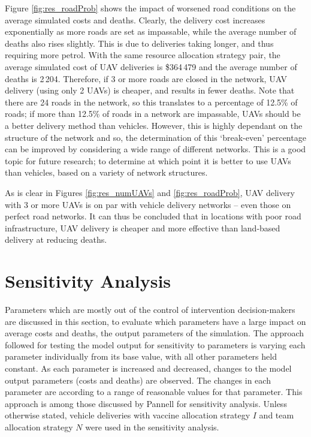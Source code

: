 Figure \ref{fig:res_roadProb} shows the impact of worsened road conditions on the average simulated costs and deaths. Clearly, the delivery cost increases exponentially as more roads are set as impassable, while the average number of deaths also rises slightly. This is due to deliveries taking longer, and thus requiring more petrol. With the same resource allocation strategy pair, the average simulated cost of UAV deliveries is \$364\,479 and the average number of deaths is 2\,204. Therefore, if 3 or more roads are closed in the network, UAV delivery (using only 2 UAVs) is cheaper, and results in fewer deaths. Note that there are 24 roads in the network, so this translates to a percentage of 12.5\% of roads; if more than 12.5\% of roads in a network are impassable, UAVs should be a better delivery method than vehicles. However, this is highly dependant on the structure of the network and so, the determination of this `break-even' percentage can be improved by considering a wide range of different networks. This is a good topic for future research; to determine at which point it is better to use UAVs than vehicles, based on a variety of network structures.

As is clear in Figures \ref{fig:res_numUAVs} and \ref{fig:res_roadProb}, UAV delivery with 3 or more UAVs is on par with vehicle delivery networks -- even those on perfect road networks. It can thus be concluded that in locations with poor road infrastructure, UAV delivery is cheaper and more effective than land-based delivery at reducing deaths.

\section{Sensitivity Analysis}
\label{sec:res_sensAn}
Parameters which are mostly out of the control of intervention decision-makers are discussed in this section, to evaluate which parameters have a large impact on average costs and deaths, the output parameters of the simulation.
The approach followed for testing the model output for sensitivity to parameters is varying each parameter individually from its base value, with all other parameters held constant. As each parameter is increased and decreased, changes to the model output parameters (costs and deaths) are observed. The changes in each parameter are according to a range of reasonable values for that parameter. This approach is among those discussed by Pannell \cite{pannell1997sensitivity} for sensitivity analysis. Unless otherwise stated, vehicle deliveries with vaccine allocation strategy $I$ and team allocation strategy $N$ were used in the sensitivity analysis.

